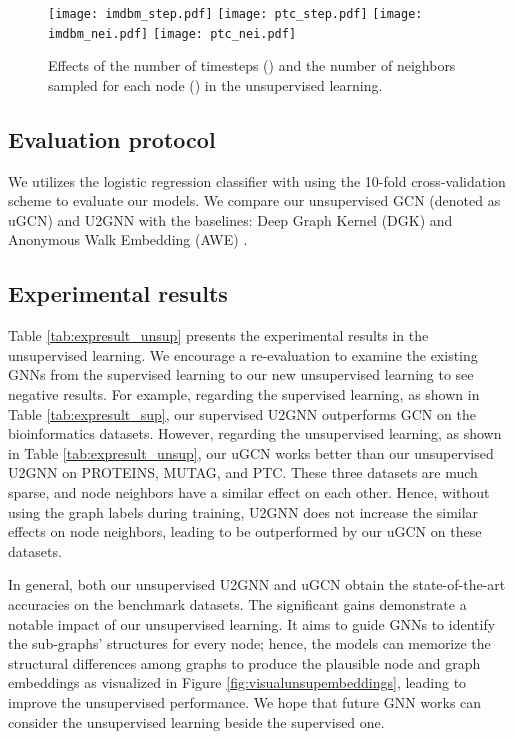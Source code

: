\documentclass[twoside,leqno,twocolumn]{article}
\newcommand{\citep}{\cite}
\begin{document}
\begin{figure*}[ht]
\centering
    \texttt{[image: imdbm\_step.pdf]}
    \texttt{[image: ptc\_step.pdf]}
    \texttt{[image: imdbm\_nei.pdf]}
    \texttt{[image: ptc\_nei.pdf]}
\caption[short]{Effects of the number of timesteps () and the number of neighbors sampled for each node () in the unsupervised learning.}
\label{fig:hypereffectNT}
\end{figure*}


\subsection{Evaluation protocol} 
We utilizes the logistic regression classifier \citep{Fan:2008} with using the 10-fold cross-validation scheme to evaluate our models.
We compare our unsupervised GCN (denoted as uGCN) and U2GNN with the baselines: Deep Graph Kernel (DGK) \citep{yanardag2015deep} and Anonymous Walk Embedding (AWE) \citep{ivanov2018anonymous}.

\subsection{Experimental results}
\label{subsec:unsupresults}

Table \ref{tab:expresult_unsup} presents the experimental results in the unsupervised learning.
We encourage a re-evaluation to examine the existing GNNs from the supervised learning to our new unsupervised learning to see negative results.
For example, regarding the supervised learning, as shown in Table \ref{tab:expresult_sup}, our supervised U2GNN outperforms GCN on the bioinformatics datasets.
However, regarding the unsupervised learning, as shown in Table \ref{tab:expresult_unsup}, our uGCN works better than our unsupervised U2GNN on PROTEINS, MUTAG, and PTC.
These three datasets are much sparse, and node neighbors have a similar effect on each other. 
Hence, without using the graph labels during training, U2GNN does not increase the similar effects on node neighbors, leading to be outperformed by our uGCN on these datasets.

In general, both our unsupervised U2GNN and uGCN obtain the state-of-the-art accuracies on the benchmark datasets.
The significant gains demonstrate a notable impact of our unsupervised learning.
It aims to guide GNNs to identify the sub-graphs' structures for every node; hence, the models can memorize the structural differences among graphs to produce the plausible node and graph embeddings as visualized in Figure \ref{fig:visualunsupembeddings}, leading to improve the unsupervised performance.
We hope that future GNN works can consider the unsupervised learning beside the supervised one.
\end{document}
